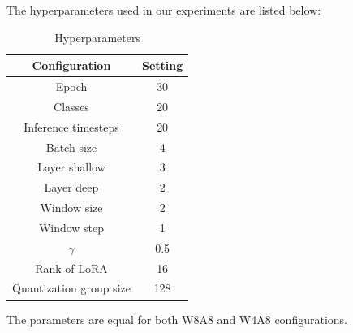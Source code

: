 \documentclass{article}
\begin{document}
The hyperparameters used in our experiments are listed below:

\begin{table}[h!]
    \caption{Hyperparameters}
    \centering
    \begin{small}
        \begin{tabular}{c|c}
            \toprule
            Configuration&Setting\\
            \midrule
            Epoch& 30\\
            Classes& 20\\
            Inference timesteps& 20\\
            Batch size& 4\\
            \midrule
            Layer shallow& 3\\
            Layer deep& 2\\
            Window size& 2\\
            Window step& 1\\
            \midrule
            $\gamma$& 0.5\\
            Rank of LoRA& 16\\
            Quantization group size& 128\\
            \bottomrule
        \end{tabular}
    \end{small}
\end{table}

The parameters are equal for both W8A8 and W4A8 configurations.
\end{document}
